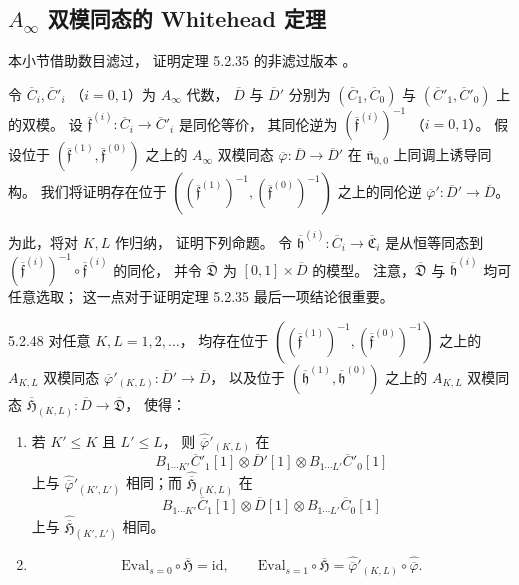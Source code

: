 
\subsection{$A_\infty$ 双模同态的 Whitehead 定理}
\label{subsec:5-2-6}

本小节借助数目滤过，
证明定理 5.2.35 的非滤过版本
。

令 $\overline C_i,\overline C'_i$
（$i=0,1$）为 $A_\infty$ 代数，
$\overline D$ 与 $\overline D'$
分别为
$(\overline C_1,\overline C_0)$
与
$(\overline C'_1,\overline C'_0)$
上的双模。
设
$\overline{\mathfrak f}^{(i)}:
\overline C_i\to\overline C'_i$
是同伦等价，
其同伦逆为
$(\overline{\mathfrak f}^{(i)})^{-1}$
（$i=0,1$）。
假设位于
$(\overline{\mathfrak f}^{(1)},
  \overline{\mathfrak f}^{(0)})$
之上的 $A_\infty$ 双模同态
$\overline\varphi:
\overline D\to\overline D'$
在 $\overline{\mathfrak n}_{0,0}$
上同调上诱导同构。
我们将证明存在位于
$((\overline{\mathfrak f}^{(1)})^{-1},
   (\overline{\mathfrak f}^{(0)})^{-1})$
之上的同伦逆
$\overline\varphi':
\overline D'\to\overline D$。

为此，将对 $K,L$ 作归纳，
证明下列命题。
令
$\overline{\mathfrak h}^{(i)}:
\overline C_i\to
\overline{\mathfrak C}_i$
是从恒等同态到
$(\overline{\mathfrak f}^{(i)})^{-1}
\circ\overline{\mathfrak f}^{(i)}$
的同伦，
并令 $\overline{\mathfrak D}$
为 $[0,1]\times\overline D$ 的模型。
注意，$\overline{\mathfrak D}$
与 $\overline{\mathfrak h}^{(i)}$
均可任意选取；
这一点对于证明定理 5.2.35
最后一项结论很重要。

\begin{proposition}{5.2.48}\label{prop:5-2-48}
对任意 $K,L=1,2,\ldots$，
均存在位于
$((\overline{\mathfrak f}^{(1)})^{-1},
   (\overline{\mathfrak f}^{(0)})^{-1})$
之上的 $A_{K,L}$ 双模同态
$\overline\varphi'_{(K,L)}:
\overline D'\to\overline D$，
以及位于
$(\overline{\mathfrak h}^{(1)},
  \overline{\mathfrak h}^{(0)})$
之上的 $A_{K,L}$ 双模同态
$\overline{\mathfrak H}_{(K,L)}:
\overline D\to\overline{\mathfrak D}$，
使得：
\begin{enumerate}[label=\textup{(5.2.49.\arabic*)},leftmargin=5.8em]
\item\label{cond:5-2-49-1}
若 $K'\leq K$ 且 $L'\leq L$，
则
$\widehat{\overline\varphi}'_{(K,L)}$
在
\[
B_{1\cdots K'}\overline C'_1[1]
\otimes\overline D'[1]
\otimes B_{1\cdots L'}\overline C'_0[1]
\]
上与
$\widehat{\overline\varphi}'_{(K',L')}$
相同；而
$\widehat{\overline{\mathfrak H}}_{(K,L)}$
在
\[
B_{1\cdots K'}\overline C_1[1]
\otimes\overline D[1]
\otimes B_{1\cdots L'}\overline C_0[1]
\]
上与
$\widehat{\overline{\mathfrak H}}_{(K',L')}$
相同。
\item\label{cond:5-2-49-2}
\[
\mathrm{Eval}_{s=0}
\circ\overline{\mathfrak H}
=\mathrm{id},
\qquad
\mathrm{Eval}_{s=1}
\circ\overline{\mathfrak H}
=\widehat{\overline\varphi}'_{(K,L)}
\circ\widehat{\overline\varphi}.
\]
\end{enumerate}
\end{proposition}

